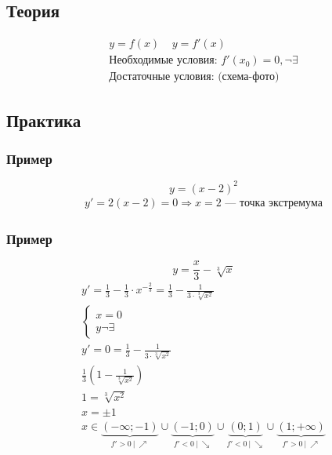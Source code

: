 \documentclass{article}
\begin{document}
\subsection{Теория}
\begin{gather*}
    y = f(x) ~~~~~ y = f'(x) \\
    \text{Необходимые условия: } f'(x_0) = 0, \neg \exists \\
    \text{Достаточные условия: (схема-фото)} 
\end{gather*}



\subsection{Практика}

\subsubsection{Пример}
\[
    y = (x - 2)^2
\]
\begin{gather*}
    y' = 2(x - 2) = 0 \Rightarrow x = 2 \text{ --- точка экстремума}
\end{gather*}

\subsubsection{Пример}
\[
    y = \frac{x}{3} - \sqrt[3]{x}
\]
\begin{gather*}
    y' = \frac{1}{3} - \frac{1}{3} \cdot x^{-\frac{2}{3}} =
    \frac{1}{3} - \frac{1}{3 \cdot \sqrt[3]{x^2}} \\
    \begin{cases}
        x = 0 \\
        y \neg \exists
    \end{cases} \\
    y' = 0 = \frac{1}{3} - \frac{1}{3 \cdot \sqrt[3]{x^2}} \\
    \frac{1}{3} \left( 1 - \frac{1}{\sqrt[3]{x^2}} \right) \\
    1 = \sqrt[3]{x^2} \\
    x = \pm 1 \\
    x \in \underbrace{(-\infty; -1)}_{f' > 0 ~|~ \nearrow} \cup \underbrace{(-1; 0)}_{f' < 0 ~|~ \searrow} \cup \underbrace{(0; 1)}_{f' < 0 ~|~ \searrow} \cup \underbrace{(1; +\infty)}_{f' > 0 ~|~ \nearrow}
\end{gather*}
\end{document}
